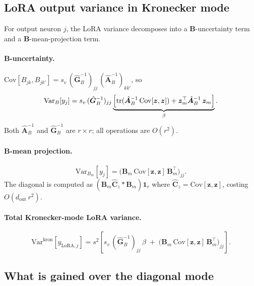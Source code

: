 \documentclass[11pt]{article}
\newcommand{\Var}{\mathrm{Var}}
\newcommand{\Cov}{\mathrm{Cov}}
\newcommand{\tr}{\mathrm{tr}}
\begin{document}
\subsection{LoRA output variance in Kronecker mode}

For output neuron $j$, the LoRA variance decomposes into a $\bm B$-uncertainty
term and a $\bm B$-mean-projection term.

\paragraph{$\bm B$-uncertainty.}
$\Cov[B_{jk}, B_{jk'}] = s_v\,(\hat{\bm G}_B^{-1})_{jj}\,(\hat{\bm A}_B^{-1})_{kk'}$, so
\begin{equation}
  \Var_B[y_j] = s_v\,(\hat{\bm G}_B^{-1})_{jj}
  \underbrace{\Bigl[\tr(\hat{\bm A}_B^{-1}\,\Cov[\bm z,\bm z])
                    + \bm z_m^\top \hat{\bm A}_B^{-1}\,\bm z_m\Bigr]}_{\beta}.
\end{equation}
Both $\hat{\bm A}_B^{-1}$ and $\hat{\bm G}_B^{-1}$ are $r \times r$; all
operations are $O(r^2)$.

\paragraph{$\bm B$-mean projection.}
\begin{equation}
  \Var_{B_m}[y_j] = \bigl(\bm B_m\,\Cov[\bm z,\bm z]\,\bm B_m^\top\bigr)_{jj}.
\end{equation}
The diagonal is computed as $(\bm B_m \hat{\bm C}_z * \bm B_m)\bm 1_r$ where
$\hat{\bm C}_z = \Cov[\bm z,\bm z]$, costing $O(d_\text{out}\,r^2)$.

\paragraph{Total Kronecker-mode LoRA variance.}
\begin{equation}
  \boxed{
  \Var^\text{kron}[y_{\text{LoRA},j}] = s^2\!\left[
    s_v\,(\hat{\bm G}_B^{-1})_{jj}\,\beta
    \;+\;
    \bigl(\bm B_m\,\Cov[\bm z,\bm z]\,\bm B_m^\top\bigr)_{jj}
  \right].
  }
  \label{eq:kronvar}
\end{equation}

\subsection{What is gained over the diagonal mode}
\end{document}
